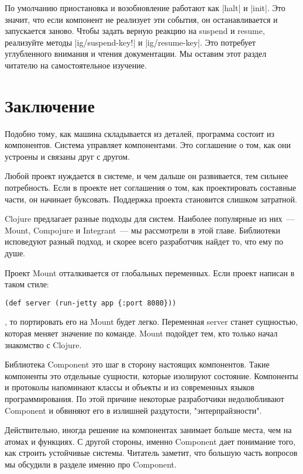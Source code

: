 По умолчанию приостановка и возобновление работают как \spverb|halt| и \spverb|init|. Это
значит, что если компонент не реализует эти события, он останавливается и
запускается заново. Чтобы задать верную реакцию на suspend и resume, реализуйте
методы \spverb|ig/suspend-key!| и \spverb|ig/resume-key|. Это потребует углубленного внимания
и чтения документации. Мы оставим этот раздел читателю на самостоятельное
изучение.

\section{Заключение}

Подобно тому, как машина складывается из деталей, программа состоит из
компонентов. Система управляет компонентами. Это соглашение о том, как они
устроены и связаны друг с другом.

Любой проект нуждается в системе, и чем дальше он развивается, тем сильнее
потребность. Если в проекте нет соглашения о том, как проектировать составные
части, он начинает буксовать. Поддержка проекта становится слишком затратной.

Clojure предлагает разные подходы для систем. Наиболее популярные из них~---
Mount, Compojure и Integrant~--- мы рассмотрели в этой главе. Библиотеки
исповедуют разный подход, и скорее всего разработчик найдет то, что ему по душе.

Проект Mount отталкивается от глобальных переменных. Если проект написан в таком
стиле:

\begin{verbatim}
(def server (run-jetty app {:port 8080}))
\end{verbatim}

, то портировать его на Mount будет легко. Переменная server станет сущностью,
которая меняет значение по команде. Mount подойдет тем, кто только начал
знакомство с Clojure.

Библиотека Component это шаг в сторону настоящих компонентов. Такие компоненты
это отдельные сущности, которые изолируют состояние. Компоненты и протоколы
напоминают классы и объекты и из современных языков программирования. По этой
причине некоторые разработчики недолюбливают Component и обвиняют его в излишней
раздутости, "энтерпрайзности".

Действительно, иногда решение на компонентах занимает больше места, чем на
атомах и функциях. С другой стороны, именно Component дает понимание того, как
строить устойчивые системы. Читатель заметит, что большую часть вопросов мы
обсудили в разделе именно про Component.

